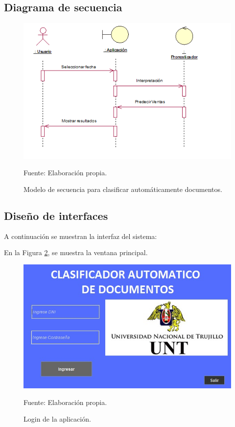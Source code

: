 \subsection{Diagrama de secuencia}
\begin{figure}[h!]
	\centering
		\includegraphics[scale=1]{imagenes/diagramasecuencia.png}
		\caption{Modelo de secuencia para clasificar automáticamente documentos.}
	\begin{center}
    Fuente: Elaboración propia.
    \end{center}
	\label{fig:dsecuencia222}
\end{figure}
\newpage


\subsection{Diseño de interfaces}
A continuación se muestran la interfaz del sistema:

En la Figura \ref{fig:InterfazAppCap3}, se muestra la ventana principal.

\begin{figure}[h!]
	\centering
		\includegraphics[scale=0.43]{imagenes/interfazApp.jpeg}
		\caption{Login de la aplicación.}
		\begin{center}
    Fuente: Elaboración propia.
    \end{center}
	\label{fig:InterfazAppCap3}
\end{figure}

